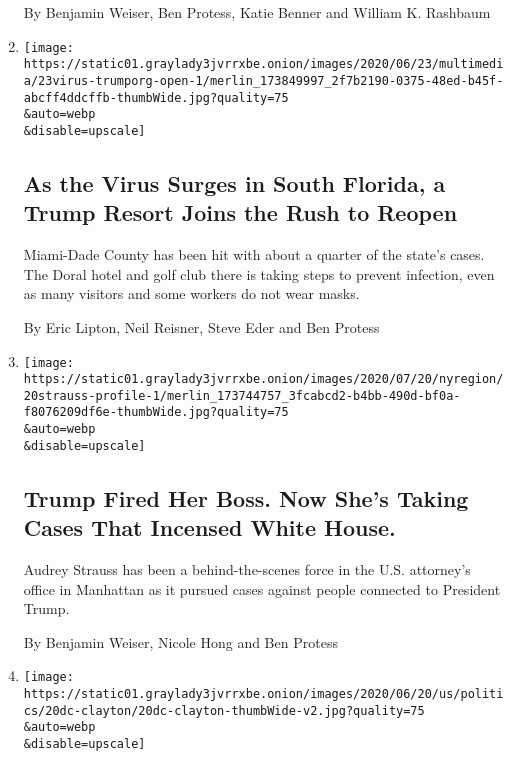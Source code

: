 \begin{enumerate}
  By Benjamin Weiser, Ben Protess, Katie Benner and William K. Rashbaum
\item
  \href{/2020/06/23/us/trump-doral-reopen-coronavirus.html}{}

  \texttt{[image: https://static01.graylady3jvrrxbe.onion/images/2020/06/23/multimedia/23virus-trumporg-open-1/merlin\_173849997\_2f7b2190-0375-48ed-b45f-abcff4ddcffb-thumbWide.jpg?quality=75\\\&auto=webp\\\&disable=upscale]}

  \hypertarget{as-the-virus-surges-in-south-florida-a-trump-resort-joins-the-rush-to-reopen}{%
  \subsection{As the Virus Surges in South Florida, a Trump Resort Joins
  the Rush to
  Reopen}\label{as-the-virus-surges-in-south-florida-a-trump-resort-joins-the-rush-to-reopen}}

  Miami-Dade County has been hit with about a quarter of the state's
  cases. The Doral hotel and golf club there is taking steps to prevent
  infection, even as many visitors and some workers do not wear masks.

  By Eric Lipton, Neil Reisner, Steve Eder and Ben Protess
\item
  \href{/2020/06/21/nyregion/us-attorney-trump-audrey-strauss.html}{}

  \texttt{[image: https://static01.graylady3jvrrxbe.onion/images/2020/07/20/nyregion/20strauss-profile-1/merlin\_173744757\_3fcabcd2-b4bb-490d-bf0a-f8076209df6e-thumbWide.jpg?quality=75\\\&auto=webp\\\&disable=upscale]}

  \hypertarget{trump-fired-her-boss-now-shes-taking-cases-that-incensed-white-house}{%
  \subsection{Trump Fired Her Boss. Now She's Taking Cases That Incensed
  White
  House.}\label{trump-fired-her-boss-now-shes-taking-cases-that-incensed-white-house}}

  Audrey Strauss has been a behind-the-scenes force in the U.S.
  attorney's office in Manhattan as it pursued cases against people
  connected to President Trump.

  By Benjamin Weiser, Nicole Hong and Ben Protess
\item
  \href{/2020/06/20/business/jay-clayton-sdny-sec.html}{}

  \texttt{[image: https://static01.graylady3jvrrxbe.onion/images/2020/06/20/us/politics/20dc-clayton/20dc-clayton-thumbWide-v2.jpg?quality=75\\\&auto=webp\\\&disable=upscale]}


\end{enumerate}
